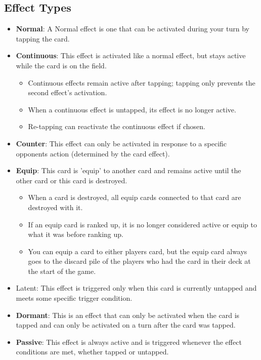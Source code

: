 \subsection{Effect Types\label{CardEffectsSection}}

\begin{itemize}
    \item \textbf{Normal}: A Normal effect is one that can be activated during your turn by tapping the card.
    \item \textbf{Continuous}: This effect is activated like a normal effect, but stays active while the card is on the field.
    \begin{itemize}
		\item Continuous effects remain active after tapping; tapping only prevents the second effect’s activation.
		\item When a continuous effect is untapped, its effect is no longer active.
		\item Re-tapping can reactivate the continuous effect if chosen.
    \end{itemize}
	\item \textbf{Counter}: This effect can only be activated in response to a specific opponents action (determined by the card effect).
	\item \textbf{Equip}: This card is 'equip' to another card and remains active until the other card or this card is destroyed. 
	\begin{itemize}
		\item When a card is destroyed, all equip cards connected to that card are destroyed with it.
		\item If an equip card is ranked up, it is no longer considered active or equip to what it was before ranking up.
		\item You can equip a card to either players card, but the equip card always goes to the discard pile of the players who had the card in their deck at the start of the game.
	\end{itemize}
	\item Latent: This effect is triggered only when this card is currently untapped and meets some specific trigger condition. 
	\item \textbf{Dormant}: This is an effect that can only be activated when the card is tapped and can only be activated on a turn after the card was tapped.
	\item \textbf{Passive}: This effect is always active and is triggered whenever the effect conditions are met, whether tapped or untapped.

\end{itemize}
